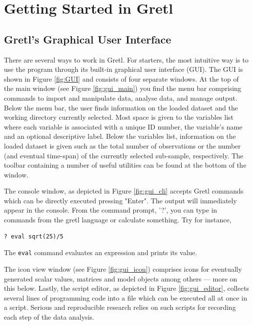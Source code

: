 \documentclass[11pt]{article}
\begin{document}
\section{Getting Started in Gretl}
\subsection{Gretl's Graphical User Interface}
There are several ways to work in Gretl. For starters, the most intuitive way is to use the program through its built-in graphical user interface (GUI). The GUI is shown in Figure \ref{fig:GUI} and consists of four separate windows. At the top of the main window (see Figure \ref{fig:gui_main}) you find the menu bar comprising commands to import and manipulate data, analyse data, and manage output. Below the menu bar, the user finds information on the loaded dataset and the working directory currently selected. Most space is given to the variables list where each variable is associated with a unique ID number, the variable's name and an optional descriptive label. Below the variables list, information on the loaded dataset is given such as the total number of observations or the number (and eventual time-span) of the currently selected sub-sample, respectively. The toolbar containing a number of useful utilities can be found at the bottom of the window. 

The console window, as depicted in Figure \ref{fig:gui_cli} accepts Gretl commands which can be directly executed pressing "Enter". The output will immediately appear in the console. From the command prompt, '?', you can type in commands from the gretl language or calculate something. Try for instance,
\begin{verbatim}
? eval sqrt(25)/5
\end{verbatim}
The \texttt{eval} command evaluates an expression and prints its value.

The icon view window (see Figure \ref{fig:gui_icon}) comprises icons for eventually generated scalar values, matrices and model objects among others --- more on this below. Lastly, the script editor, as depicted in Figure \ref{fig:gui_editor}, collects several lines of programming code into a file which can be executed all at once in a script. Serious and reproducible research relies on such scripts for recording each step of the data analysis.
\end{document}
